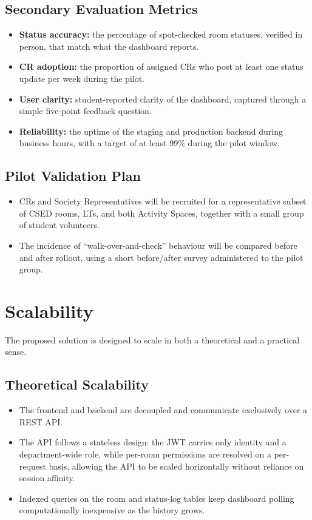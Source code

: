 \documentclass[11pt]{article}
\begin{document}
\subsection{Secondary Evaluation Metrics}

\begin{itemize}
    \item \textbf{Status accuracy:} the percentage of spot-checked room statuses, verified in person, that match what the dashboard reports.
    \item \textbf{CR adoption:} the proportion of assigned CRs who post at least one status update per week during the pilot.
    \item \textbf{User clarity:} student-reported clarity of the dashboard, captured through a simple five-point feedback question.
    \item \textbf{Reliability:} the uptime of the staging and production backend during business hours, with a target of at least 99\% during the pilot window.
\end{itemize}

\subsection{Pilot Validation Plan}

\begin{itemize}
    \item CRs and Society Representatives will be recruited for a representative subset of CSED rooms, LTs, and both Activity Spaces, together with a small group of student volunteers.
    \item The incidence of ``walk-over-and-check'' behaviour will be compared before and after rollout, using a short before/after survey administered to the pilot group.
\end{itemize}

\section{Scalability}

The proposed solution is designed to scale in both a theoretical and a practical sense.

\subsection{Theoretical Scalability}

\begin{itemize}
    \item The frontend and backend are decoupled and communicate exclusively over a REST API.
    \item The API follows a stateless design: the JWT carries only identity and a department-wide role, while per-room permissions are resolved on a per-request basis, allowing the API to be scaled horizontally without reliance on session affinity.
    \item Indexed queries on the room and status-log tables keep dashboard polling computationally inexpensive as the history grows.
\end{itemize}
\end{document}
